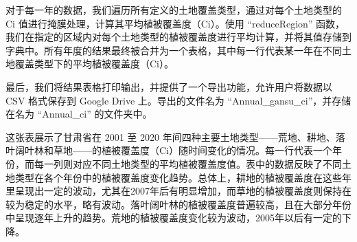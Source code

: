 \documentclass{article}
\begin{document}
		对于每一年的数据，我们遍历所有定义的土地覆盖类型，通过对每个土地类型的 Ci 值进行掩膜处理，计算其平均植被覆盖度（Ci）。使用 ``reduceRegion'' 函数，我们在指定的区域内对每个土地类型的植被覆盖度进行平均计算，并将其值存储到字典中。所有年度的结果最终被合并为一个表格，其中每一行代表某一年在不同土地覆盖类型下的平均植被覆盖度（Ci）。
		
		最后，我们将结果表格打印输出，并提供了一个导出功能，允许用户将数据以 CSV 格式保存到 Google Drive 上。导出的文件名为 ``Annual\_gansu\_ci''，并存储在名为 ``Annual\_ci'' 的文件夹中。

		这张表展示了甘肃省在 2001 至 2020 年间四种主要土地类型——荒地、耕地、落叶阔叶林和草地——的植被覆盖度（Ci）随时间变化的情况。每一行代表一个年份，而每一列则对应不同土地类型的平均植被覆盖度值。表中的数据反映了不同土地类型在各个年份中的植被覆盖度变化趋势。总体上，耕地的植被覆盖度在这些年里呈现出一定的波动，尤其在2007年后有明显增加，而草地的植被覆盖度则保持在较为稳定的水平，略有波动。落叶阔叶林的植被覆盖度普遍较高，且在大部分年份中呈现逐年上升的趋势。荒地的植被覆盖度变化较为波动，2005年以后有一定的下降。
		
\end{document}
